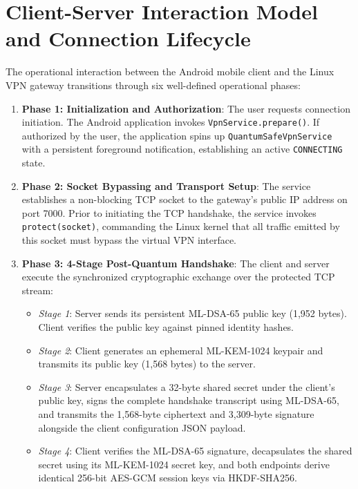 \section{Client-Server Interaction Model and Connection Lifecycle}
\label{sec:client_server_lifecycle}

The operational interaction between the Android mobile client and the Linux VPN gateway transitions through six well-defined operational phases:

\begin{enumerate}
    \item \textbf{Phase 1: Initialization and Authorization}: The user requests connection initiation. The Android application invokes \texttt{VpnService.prepare()}. If authorized by the user, the application spins up \texttt{QuantumSafeVpnService} with a persistent foreground notification, establishing an active \texttt{CONNECTING} state.
    \item \textbf{Phase 2: Socket Bypassing and Transport Setup}: The service establishes a non-blocking TCP socket to the gateway's public IP address on port 7000. Prior to initiating the TCP handshake, the service invokes \texttt{protect(socket)}, commanding the Linux kernel that all traffic emitted by this socket must bypass the virtual VPN interface.
    \item \textbf{Phase 3: 4-Stage Post-Quantum Handshake}: The client and server execute the synchronized cryptographic exchange over the protected TCP stream:
    \begin{itemize}
        \item \textit{Stage 1}: Server sends its persistent ML-DSA-65 public key (1,952 bytes). Client verifies the public key against pinned identity hashes.
        \item \textit{Stage 2}: Client generates an ephemeral ML-KEM-1024 keypair and transmits its public key (1,568 bytes) to the server.
        \item \textit{Stage 3}: Server encapsulates a 32-byte shared secret under the client's public key, signs the complete handshake transcript using ML-DSA-65, and transmits the 1,568-byte ciphertext and 3,309-byte signature alongside the client configuration JSON payload.
        \item \textit{Stage 4}: Client verifies the ML-DSA-65 signature, decapsulates the shared secret using its ML-KEM-1024 secret key, and both endpoints derive identical 256-bit AES-GCM session keys via HKDF-SHA256.
    \end{itemize}

\end{enumerate}
